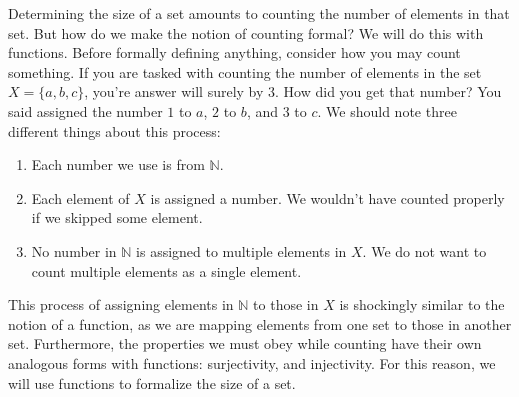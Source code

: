 \documentclass{article}
\newcommand{\N}{\mathbb{N}}
\theoremstyle{definition}
\begin{document}
Determining the size of a set amounts to counting the number of elements in that set. But how do we make the notion of counting formal? We will do this with functions. Before formally defining anything, consider how you may count something. If you are tasked with counting the number of elements in the set $ X=\{a,b,c\} $, you're answer will surely by 3. How did you get that number? You said assigned the number $ 1 $ to $ a $, $ 2 $ to $ b $, and $ 3 $ to $ c $. We should note three different things about this process:
\begin{enumerate}
	\item Each number we use is from $ \N $.
	\item Each element of $ X $ is assigned a number. We wouldn't have counted properly if we skipped some element. 
	\item No number in $ \N $ is assigned to multiple elements in $ X $. We do not want to count multiple elements as a single element.
\end{enumerate}
This process of assigning elements in $ \N $ to those in $ X $ is shockingly similar to the notion of a function, as we are mapping elements from one set to those in another set. Furthermore, the properties we must obey while counting have their own analogous forms with functions: surjectivity, and injectivity. For this reason, we will use functions to formalize the size of a set.
\end{document}
